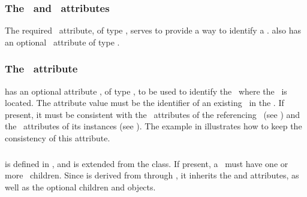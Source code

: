 \subsubsection{The \idAtt\ and \nameAtt\ attributes}
\label{def:SpeciesType:idAndName}

The required \idAtt\ attribute, of type \SIdPT, serves to provide a way to identify a \speciesType.  also has an optional \nameAtt\ attribute of type \stringPT. 
               
\subsubsection{The \compartmentAtt\ attribute}
\label{def:SpeciesType:compartment}

 has an optional attribute \compartmentAtt, of type \SIdRefPT, to be used to identify the \compartment\ where the \speciesType\ is located. The attribute value must be the identifier of an existing \compartment\ in the \model. If present, it must be consistent with the \compartmentAtt\ attributes of the referencing \species\ (see ) and the \compartmentReferenceAtt\ attributes of its instances (see ). The example in  illustrates how to keep the consistency of this attribute.

\subsubsection{}
\label{def:ListOfSpeciesFeatureTypes}

 is defined in , and is extended from the  class. If present, a \listOfSpeciesFeatureTypes\ must have one or more \SpeciesFeatureType\ children.  Since  is derived from  through , it inherits the  and  attributes, as well as the optional children  and  objects. 

\subsubsection{}
\label{def:ListOfSpeciesTypeInstances}

